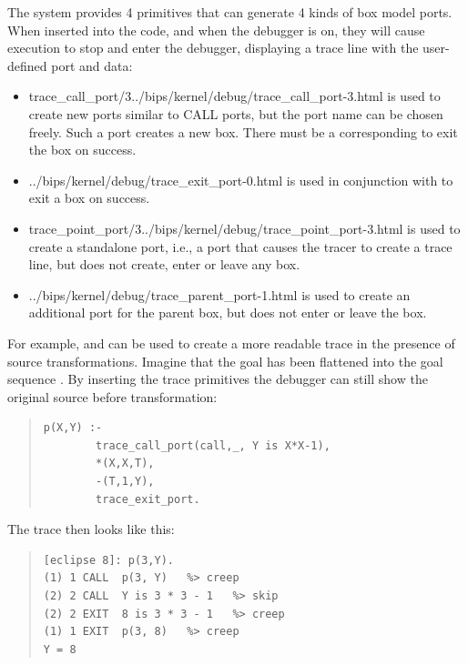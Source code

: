 The system provides 4 primitives that can generate 4 kinds of box model ports.
When inserted into the code, and when the debugger is on,
they will cause execution to stop and enter the debugger,
displaying a trace line with the user-defined port and data:
\begin{itemize}
\item {}%
{trace_call_port/3}{../bips/kernel/debug/trace_call_port-3.html}
	is used to create new ports similar to CALL ports, but the port name
	can be chosen freely. Such a port creates a new box. There must be
	a corresponding  to exit the box on
        success.
\item {}%
{../bips/kernel/debug/trace_exit_port-0.html}
	is used in conjunction with  to exit a box
	on success.
\item {}%
{trace_point_port/3}{../bips/kernel/debug/trace_point_port-3.html}
	is used to create a standalone port, i.e., a port that causes the
	tracer to create a trace line, but does not create, enter or leave
	any box.
\item {}%
{../bips/kernel/debug/trace_parent_port-1.html}
	is used to create an additional port for the parent box, but does
	not enter or leave the box.
\end{itemize}
For example,  and 
can be used to
create a more readable trace in the presence of source
transformations.  Imagine that the goal 
has been flattened into the goal sequence .
By inserting the trace primitives the debugger can still show the
original source before transformation:
\begin{quote}
\begin{verbatim}
p(X,Y) :-
        trace_call_port(call,_, Y is X*X-1),
        *(X,X,T),
        -(T,1,Y),
        trace_exit_port.
\end{verbatim}
\end{quote}
The trace then looks like this:
\begin{quote}
\begin{verbatim}
[eclipse 8]: p(3,Y).
(1) 1 CALL  p(3, Y)   %> creep
(2) 2 CALL  Y is 3 * 3 - 1   %> skip
(2) 2 EXIT  8 is 3 * 3 - 1   %> creep
(1) 1 EXIT  p(3, 8)   %> creep
Y = 8
\end{verbatim}
\end{quote}
